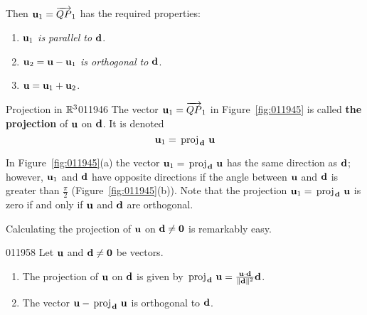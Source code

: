 Then $\textbf{u}_{1} = \overrightarrow{QP}_{1}$ has the required properties:
\begin{enumerate}
\item $\textbf{u}_{1}$ \textit{is parallel to} $\textbf{d}$.

\item $\textbf{u}_{2} = \textbf{u} - \textbf{u}_{1}$ \textit{is orthogonal to} $\textbf{d}$.

\item $\textbf{u} = \textbf{u}_{1} + \textbf{u}_{2}$.

\end{enumerate}

\hfill\begin{definition}{Projection in $\mathbb{R}^3$}{011946}
The vector $\textbf{u}_{1} = \overrightarrow{QP}_{1}$ in Figure~\ref{fig:011945} is called \textbf{the projection} of $\textbf{u}$ on $\textbf{d}$. It is denoted
\begin{equation*}
\textbf{u}_1 = \thinspace\operatorname{proj\medspace}_{\!\textbf{d}}\,{\textbf{u}}
\end{equation*}
\end{definition}


\noindent In Figure~\ref{fig:011945}(a) the vector $\textbf{u}_{1} = \thinspace\operatorname{proj\medspace}_{\!\textbf{d}}\,{\textbf{u}}$ has the same direction as $\textbf{d}$; however, $\textbf{u}_{1}$ and $\textbf{d}$ have opposite directions if the angle between $\textbf{u}$ and $\textbf{d}$ is greater than $\frac{\pi}{2}$ (Figure~\ref{fig:011945}(b)). Note that the projection $\textbf{u}_1 = \thinspace\operatorname{proj\medspace}_{\!\textbf{d}}\,{\textbf{u}}$ is zero if and only if $\textbf{u}$ and $\textbf{d}$ are orthogonal.


Calculating the projection of $\textbf{u}$ on $\textbf{d} \neq \textbf{0}$ is remarkably easy.


\begin{theorem}{}{011958}
Let $\textbf{u}$ and $\textbf{d} \neq \textbf{0}$ be vectors.


\begin{enumerate}
\item The projection of $\textbf{u}$ on $\textbf{d}$ is given by $\thinspace\operatorname{proj\medspace}_{\!\textbf{d}}\,{\textbf{u}} = \tfrac{\textbf{u} \cdot \textbf{d}}{\| \textbf{d} \|^2} \textbf{d}$.


\item The vector $\textbf{u} - \thinspace\operatorname{proj\medspace}_{\!\textbf{d}}\,{\textbf{u}}$ is orthogonal to $\textbf{d}$.

\end{enumerate}
\end{theorem}

